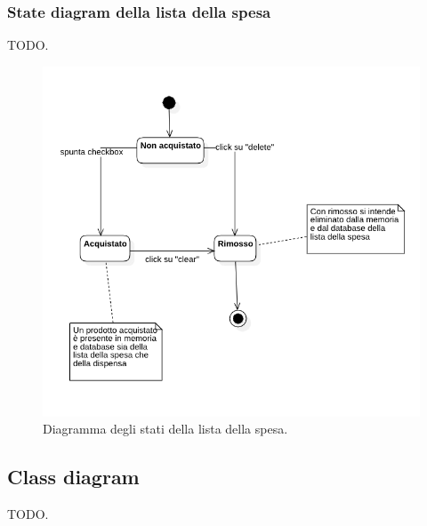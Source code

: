 \documentclass{article}
\begin{document}
\subsubsection{State diagram della lista della spesa}

TODO.

\begin{figure}[H]
    \includegraphics[width=\linewidth]{images/state-shopping-list.png}
    \caption{Diagramma degli stati della lista della spesa.}
    \label{fig:stateshoplist}
\end{figure}

\subsection{Class diagram}

TODO.
\end{document}
